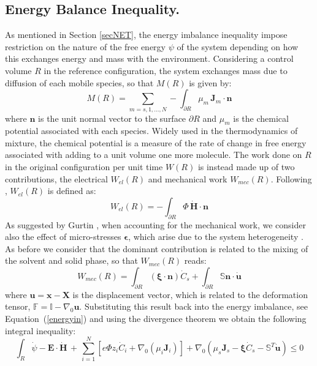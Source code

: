 \documentclass[runningheads]{llncs}
\newcommand{\F}{\ensuremath{\mathbb{F}}}
\begin{document}
\subsection{Energy Balance Inequality.}
As mentioned in Section \ref{secNET}, the energy imbalance inequality impose restriction on the nature of the free energy $\psi$ of the system depending on how this exchanges energy and mass with the environment. Considering a control volume $R$ in the reference configuration, the system exchanges mass due to diffusion of each mobile species, so that $M(R)$ is given by:
\begin{equation}
M(R)= \sum\limits_{m=s,1,\ldots,N} - \int_{\partial R} \mu_m \,\mathbf{J}_m \cdot \mathbf{n} 
\end{equation}
where $\mathbf{n}$ is the unit normal vector to the surface $\partial R$ and $\mu_m$ is the chemical potential associated with each species. Widely used in the thermodynamics of mixture, the chemical potential is a measure of the rate of change in free energy associated with adding to a unit volume one more molecule. The work done on $R$ in the original configuration per unit time $W(R)$ is instead made up of two contributions, the electrical $W_{el}(R)$ and mechanical work $W_{mec}(R)$. Following \cite{DROZDOVph}, $W_{el}(R)$ is defined as:
\begin{equation}
W_{el}(R) = -\int_{\partial R} \Phi\, \dot{\mathbf{H}}\cdot \mathbf{n}
\end{equation}
As suggested by Gurtin \cite{GURTIN}, when accounting for the mechanical work, we consider also the effect of micro-stresses $\boldsymbol{\epsilon}$, which arise due to the system heterogeneity \cite{microstress}. As before we consider that the dominant contribution is related to the mixing of the solvent and solid phase, so that $W_{mec}(R)$ reads:
\begin{equation}
W_{mec}(R) = \int_{\partial R} \left(\boldsymbol{\xi}\cdot \mathbf{n}\right)\dot{C}_s + \int_{\partial R} \mathbb{S}\mathbf{n} \cdot \dot{\mathbf{u}}
\end{equation}
where $\mathbf{u}= \mathbf{x}-\mathbf{X}$ is the displacement vector, which is related to the deformation tensor, $\F=\mathbb{I}-\nabla_0 \mathbf{u}$. Substituting this result back into the energy imbalance, see Equation~(\ref{energyin}) and using the divergence theorem we obtain the following integral inequality:
\begin{equation}
\int_R \dot{\psi} - \mathbf{E}\cdot \dot{\mathbf{H}} \, + \, \sum\limits_{i=1}^{N} \left[e \Phi  z_i \dot{C}_i+ \nabla_0 \left(\mu_i \mathbf{J}_i \right)\right] + \nabla_0 (\mu_s \mathbf{J}_s- \boldsymbol{\xi}\dot{C}_s -\mathbb{S}^T\mathbf{\dot{u}}) \leq 0 
\end{equation}
\end{document}
